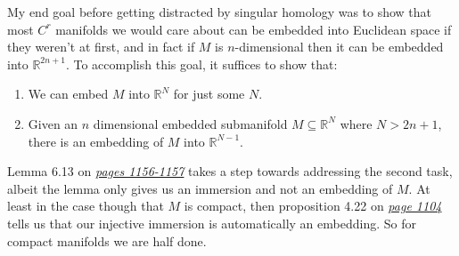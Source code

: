 \documentclass{book}
\newcommand{\inLinkRap}[2]{{\color{blue}\hyperlink{#1}{\textit{#2}}}}
\newcommand{\retTwo}{\hfill\bigbreak}
\begin{document}

My end goal before getting distracted by singular homology was to show that most $C^r$ manifolds we would care about can be embedded into Euclidean space if they weren't at first, and in fact if $M$ is $n$-dimensional then it can be embedded into $\mathbb{R}^{2n + 1}$. To accomplish this goal, it suffices to show that:
\begin{enumerate}
	\item[1.] We can embed $M$ into $\mathbb{R}^N$ for just some $N$.
	\item[2.] Given an $n$ dimensional embedded submanifold $M \subseteq \mathbb{R}^N$ where $N > 2n + 1$, there is an embedding of $M$ into $\mathbb{R}^{N - 1}$.\retTwo
\end{enumerate}

Lemma 6.13 on \inLinkRap{Lemma 6.13 page 1156}{pages 1156-1157} takes a step towards addressing the second task, albeit the lemma only gives us an immersion and not an embedding of $M$. At least in the case though that $M$ is compact, then proposition 4.22 on \inLinkRap{Proposition 4.22 page 1104}{page 1104} tells us that our injective immersion is automatically an embedding. So for compact manifolds we are half done.\retTwo
\end{document}
